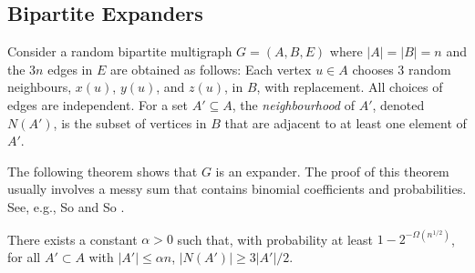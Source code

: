 \documentclass[lotsofwhite]{patmorin}
\begin{document}
\subsection{Bipartite Expanders}

Consider a random bipartite multigraph $G=(A,B,E)$ where $|A|=|B|=n$
and the $3n$ edges in $E$ are obtained as follows:  Each vertex $u\in A$
chooses 3 random neighbours, $x(u)$, $y(u)$, and $z(u)$, in $B$, with
replacement.  All choices of edges are independent. For a set $A'\subseteq
A$, the \emph{neighbourhood} of $A'$, denoted $N(A')$, is the subset of
vertices in $B$ that are adjacent to at least one element of $A'$.

The following theorem shows that $G$ is an expander.  The proof of this
theorem usually involves a messy sum that contains binomial coefficients
and probabilities.  See, e.g., So and So \cite{S}.

\begin{thm}
  There exists a constant $\alpha >0$ such that, with probability at
  least $1-2^{-\Omega(n^{1/2})}$, for all $A'\subset A$ with $|A'|\le
  \alpha n$, $|N(A')| \ge 3|A'|/2$.
\end{thm}
\end{document}

